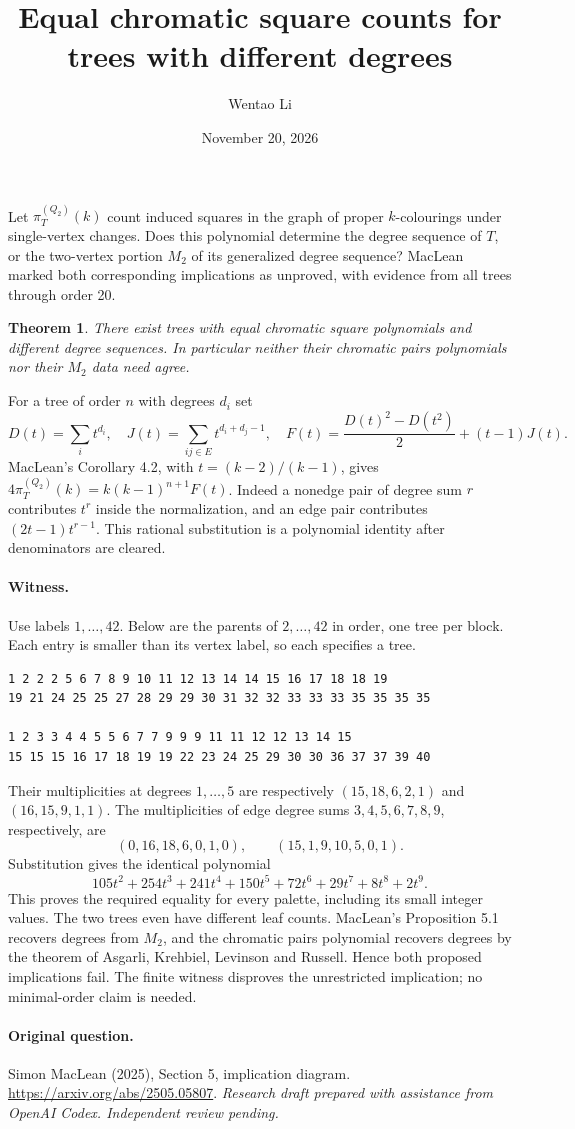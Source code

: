 \documentclass[11pt]{article}
\title{Equal chromatic square counts for trees with different degrees}
\author{Wentao Li}
\date{November 20, 2026}
\newtheorem{theorem}{Theorem}
\begin{document}
\maketitle
Let $\pi_T^{(Q_2)}(k)$ count induced squares in the graph of proper $k$-colourings under single-vertex changes. Does this polynomial determine the degree sequence of $T$, or the two-vertex portion $M_2$ of its generalized degree sequence? MacLean marked both corresponding implications as unproved, with evidence from all trees through order 20.
\begin{theorem}There exist trees with equal chromatic square polynomials and different degree sequences. In particular neither their chromatic pairs polynomials nor their $M_2$ data need agree.\end{theorem}
For a tree of order $n$ with degrees $d_i$ set
\[
 D(t)=\sum_i t^{d_i},\quad J(t)=\sum_{ij\in E}t^{d_i+d_j-1},\quad
 F(t)=\frac{D(t)^2-D(t^2)}2+(t-1)J(t).
\]
MacLean's Corollary 4.2, with $t=(k-2)/(k-1)$, gives $4\pi_T^{(Q_2)}(k)=k(k-1)^{n+1}F(t)$. Indeed a nonedge pair of degree sum $r$ contributes $t^r$ inside the normalization, and an edge pair contributes $(2t-1)t^{r-1}$. This rational substitution is a polynomial identity after denominators are cleared.
\paragraph{Witness.} Use labels $1,\ldots,42$. Below are the parents of $2,\ldots,42$ in order, one tree per block. Each entry is smaller than its vertex label, so each specifies a tree.
\begin{verbatim}
1 2 2 2 5 6 7 8 9 10 11 12 13 14 14 15 16 17 18 18 19
19 21 24 25 25 27 28 29 29 30 31 32 32 33 33 33 35 35 35 35

1 2 3 3 4 4 5 5 6 7 7 9 9 9 11 11 12 12 13 14 15
15 15 15 16 17 18 19 19 22 23 24 25 29 30 30 36 37 37 39 40
\end{verbatim}
Their multiplicities at degrees $1,\ldots,5$ are respectively $(15,18,6,2,1)$ and $(16,15,9,1,1)$. The multiplicities of edge degree sums $3,4,5,6,7,8,9$, respectively, are
\[
 (0,16,18,6,0,1,0),\qquad (15,1,9,10,5,0,1).
\]
Substitution gives the identical polynomial
\[
 105t^2+254t^3+241t^4+150t^5+72t^6+29t^7+8t^8+2t^9.
\]
This proves the required equality for every palette, including its small integer values. The two trees even have different leaf counts. MacLean's Proposition 5.1 recovers degrees from $M_2$, and the chromatic pairs polynomial recovers degrees by the theorem of Asgarli, Krehbiel, Levinson and Russell. Hence both proposed implications fail. The finite witness disproves the unrestricted implication; no minimal-order claim is needed.

\paragraph{Original question.} Simon MacLean (2025), Section 5, implication diagram. \url{https://arxiv.org/abs/2505.05807}.
\medskip\noindent\textit{Research draft prepared with assistance from OpenAI Codex. Independent review pending.}
\end{document}
